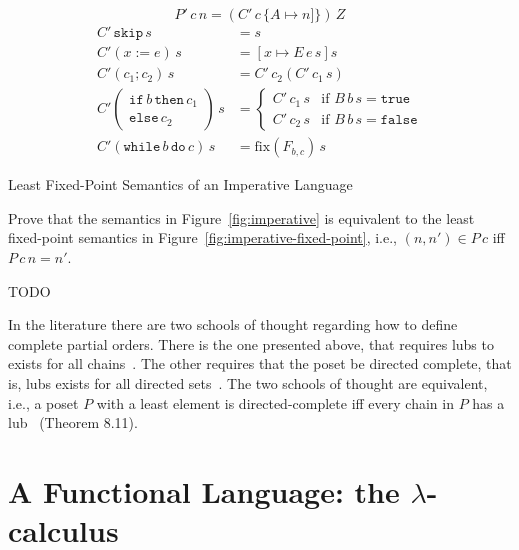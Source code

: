 \documentclass{tufte-handout}
\newcommand{\ASSIGN}[2]{#1 \mathrel{:=} #2}
\newcommand{\SEQ}[2]{#1 \mathrel{;} #2}
\newcommand{\SKIP}[0]{\mathtt{skip}}
\newcommand{\WHILE}[2]{\mathtt{while}\,#1\,\mathtt{do}\,#2}
\newcommand{\TRUE}[0]{\mathtt{true}}
\newcommand{\FALSE}[0]{\mathtt{false}}
\begin{document}
\begin{marginfigure}
\[
P'\,c\,n = (C'\,c\,\{A{\mapsto} n]\})\,Z 
\]
\begin{align*}
C'\,\SKIP\,s &= s \\ 
C'(\ASSIGN{x}{e})\,s &= [x\mapsto E\,e\,s]s\\
C'(\SEQ{c_1}{c_2})\,s &=  C'\,c_2(C'\,c_1\,s) \\
C'\left(\!\!\begin{array}{l}
  \mathtt{if}\,b\,\mathtt{then}\,c_1\\
  \mathtt{else}\,c_2
  \end{array}\!\!\right)\,s
  &= 
 \begin{cases}
  C'\,c_1\,s & \text{if } B\,b\,s = \TRUE \\
  C'\,c_2\,s & \text{if } B\,b\,s = \FALSE
 \end{cases} \\
C'(\WHILE{b}{c})\,s &= \mathrm{fix}(F_{b,c})\,s
\end{align*}
\caption{Least Fixed-Point Semantics of an Imperative Language}
\label{fig:imperative-fixed-point}
\end{marginfigure}


\begin{Exercise}
  Prove that the semantics in Figure~\ref{fig:imperative} is
  equivalent to the least fixed-point semantics in
  Figure~\ref{fig:imperative-fixed-point}, i.e., $(n,n') \in P\,c$ iff
  $P\,c\,n = n'$.
\end{Exercise}
\begin{Answer}
TODO
\end{Answer}

In the literature there are two schools of thought regarding how to
define complete partial orders. There is the one presented above, that
requires lubs to exists for all
chains~\citep{Plotkin:1983aa,Schmidt:1986vn,Winskel:1993uq}.  The
other requires that the poset be directed complete, that is, lubs
exists for all directed
sets~\citep{Gunter:1990aa,Mitchell:1996nn,Amadio:1998fk}.  The two
schools of thought are equivalent, i.e., a poset $P$ with a least
element is directed-complete iff every chain in $P$ has a
lub~\citep{Davey:2002fj} (Theorem 8.11).


\section{A Functional Language: the $\lambda$-calculus}
\label{sec:lambda}

\end{document}
